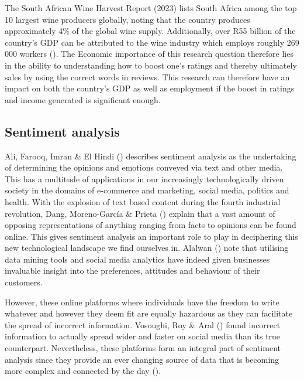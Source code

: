 \documentclass[11pt,preprint]{elsarticle}
\numberwithin{equation}{section}
\numberwithin{figure}{section}
\numberwithin{table}{section}
\begin{document}
The South African Wine Harvest Report (2023) lists South Africa among
the top 10 largest wine producers globally, noting that the country
produces approximately 4\% of the global wine supply. Additionally, over
R55 billion of the country's GDP can be attributed to the wine industry
which employs roughly 269 000 workers (). The Economic importance of this research
question therefore lies in the ability to understanding how to boost
one's ratings and thereby ultimately sales by using the correct words in
reviews. This research can therefore have an impact on both the
country's GDP as well as employment if the boost in ratings and income
generated is significant enough.

\subsection{Sentiment analysis}\label{sentiment-analysis}

Ali, Farooq, Imran \& El Hindi ()
describes sentiment analysis as the undertaking of determining the
opinions and emotions conveyed via text and other media. This has a
multitude of applications in our increasingly technologically driven
society in the domains of e-commerce and marketing, social media,
politics and health. With the explosion of text based content during the
fourth industrial revolution, Dang, Moreno-García \& Prieta
() explain that a vast amount of
opposing representations of anything ranging from facts to opinions can
be found online. This gives sentiment analysis an important role to play
in deciphering this new technological landscape we find ourselves in.
Alalwan () note that utilising data
mining tools and social media analytics have indeed given businesses
invaluable insight into the preferences, attitudes and behaviour of
their customers.

However, these online platforms where individuals have the freedom to
write whatever and however they deem fit are equally hazardous as they
can facilitate the spread of incorrect information. Vosoughi, Roy \&
Aral () found incorrect information
to actually spread wider and faster on social media than its true
counterpart. Nevertheless, these platforms form an integral part of
sentiment analysis since they provide an ever changing source of data
that is becoming more complex and connected by the day
().
\end{document}
